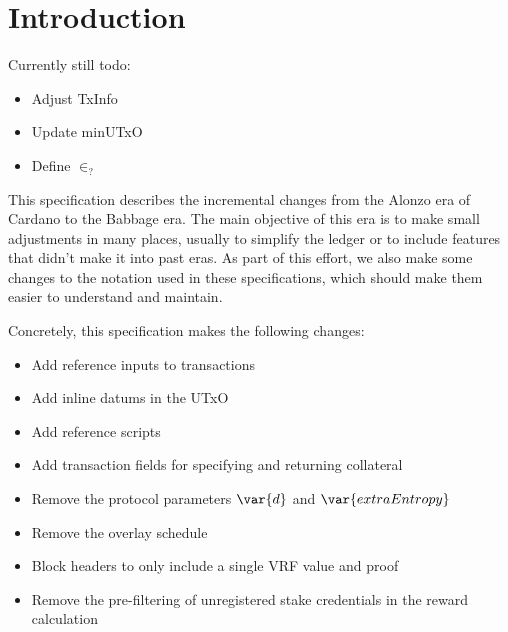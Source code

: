 \section{Introduction}

Currently still todo:

\begin{itemize}
\item Adjust TxInfo
\item Update minUTxO
\item Define $\in_?$
\end{itemize}

This specification describes the incremental changes from the Alonzo
era of Cardano to the Babbage era. The main objective of this era is
to make small adjustments in many places, usually to simplify the
ledger or to include features that didn't make it into past eras. As
part of this effort, we also make some changes to the notation used in
these specifications, which should make them easier to understand and
maintain.

Concretely, this specification makes the following changes:
\begin{itemize}
\item Add reference inputs to transactions
\item Add inline datums in the UTxO
\item Add reference scripts
\item Add transaction fields for specifying and returning collateral
\item Remove the protocol parameters $\var{d}$ and $\var{extraEntropy}$
\item Remove the overlay schedule
\item Block headers to only include a single VRF value and proof
\item Remove the pre-filtering of unregistered stake credentials in the reward calculation
\end{itemize}
